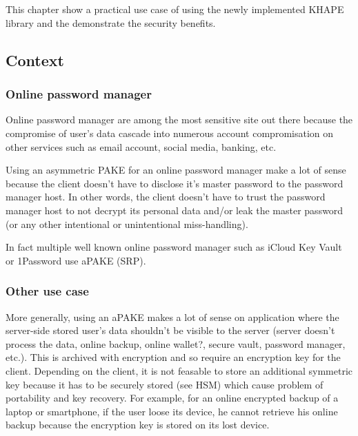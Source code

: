 \documentclass[../report.tex]{subfiles}
\begin{document}
\chapter{} \label{cha:use_case}

This chapter show a practical use case of using the newly implemented KHAPE library and the demonstrate the security benefits.

\section{Context}

\subsection{Online password manager}
Online password manager are among the most sensitive site out there because the compromise of user's data cascade into numerous account compromisation on other services such as email account, social media, banking, etc.

Using an asymmetric PAKE for an online password manager make a lot of sense because the client doesn't have to disclose it's master password to the password manager host. In other words, the client doesn't have to trust the password manager host to not decrypt its personal data and/or leak the master password (or any other intentional or unintentional miss-handling).

In fact multiple well known online password manager such as iCloud Key Vault or 1Password use aPAKE (SRP).

\subsection{Other use case}

More generally, using an aPAKE makes a lot of sense on application where the server-side stored user's data shouldn't be visible to the server (server doesn't process the data, online backup, online wallet?, secure vault, password manager, etc.). This is archived with encryption and so require an encryption key for the client.
Depending on the client, it is not feasable to store an additional symmetric key because it has to be securely stored (see HSM) which cause problem of portability and key recovery. For example, for an online encrypted backup of a laptop or smartphone, if the user loose its device, he cannot retrieve his online backup because the encryption key is stored on its lost device.
\end{document}
